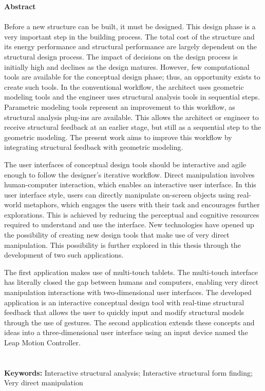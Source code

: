 \null\vfill

{\Huge \textbf{Abstract}} \\ \\
Before a new structure can be built, it must be designed. This design phase is a very important step in the building process. The total cost of the structure and its energy performance and structural performance are largely dependent on the structural design process. The impact of decisions on the design process is initially high and declines as the design matures. However, few computational tools are available for the conceptual design phase; thus, an opportunity exists to create such tools. In the conventional workflow, the architect uses geometric modeling tools and the engineer uses structural analysis tools in sequential steps. Parametric modeling tools represent an improvement to this workflow, as structural analysis plug-ins are available. This allows the architect or engineer to receive structural feedback at an earlier stage, but still as a sequential step to the geometric modeling. The present work aims to improve this workflow by integrating structural feedback with geometric modeling.

The user interfaces of conceptual design tools should be interactive and agile enough to follow the designer’s iterative workflow. Direct manipulation involves human-computer interaction, which enables an interactive user interface. In this user interface style, users can directly manipulate on-screen objects using real-world metaphors, which engages the users with their task and encourages further explorations. This is achieved by reducing the perceptual and cognitive resources required to understand and use the interface. New technologies have opened up the possibility of creating new design tools that make use of very direct manipulation. This possibility is further explored in this thesis through the development of two such applications. 

The first application makes use of multi-touch tablets. The multi-touch interface has literally closed the gap between humans and computers, enabling very direct manipulation interactions with two-dimensional user interfaces. The developed application is an interactive conceptual design tool with real-time structural feedback that allows the user to quickly input and modify structural models through the use of gestures. The second application extends these concepts and ideas into a three-dimensional user interface using an input device named the Leap Motion Controller.
\\
\\
\\
\textbf{Keywords:} Interactive structural analysis; Interactive structural form finding; Very direct manipulation



\vfill\vfill\vfill\vfill\null

